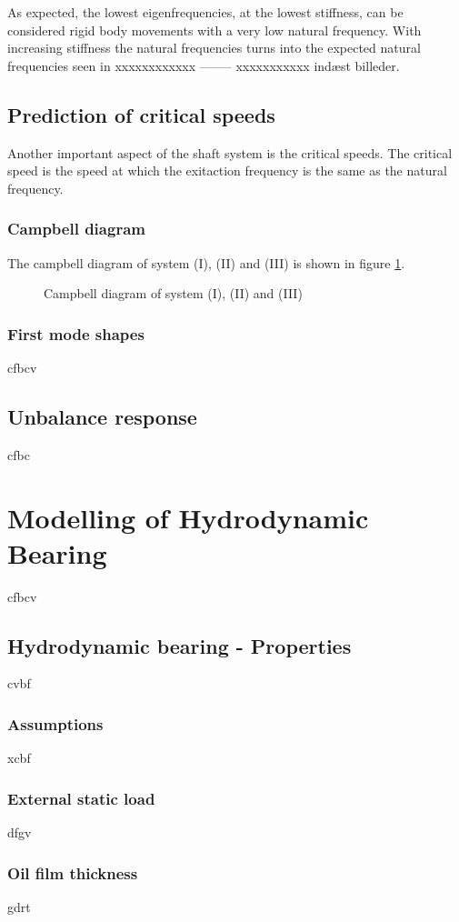 As expected, the lowest eigenfrequencies, at the lowest stiffness, can be considered rigid body movements with a very low natural frequency.
With increasing stiffness the natural frequencies turns into the expected natural frequencies seen in xxxxxxxxxxxx -------- xxxxxxxxxxx indæst billeder.

\subsection{Prediction of critical speeds}
Another important aspect of the shaft system is the critical speeds. The critical speed is the speed at which the exitaction frequency is the same as the natural frequency.

\subsubsection{Campbell diagram}
The campbell diagram of system (I), (II) and (III) is shown in figure \ref{fig:campbell_diagram}.
\begin{figure}[htbp]
    \centering
    
    \caption{Campbell diagram of system (I), (II) and (III)}
    \label{fig:campbell_diagram}
\end{figure}


\subsubsection{First mode shapes}
cfbcv
\subsection{Unbalance response}
cfbc
\section{Modelling of Hydrodynamic Bearing}
cfbcv
\subsection{Hydrodynamic bearing - Properties}
cvbf
\subsubsection{Assumptions}
xcbf
\subsubsection{External static load}
dfgv
\subsubsection{Oil film thickness}
gdrt
